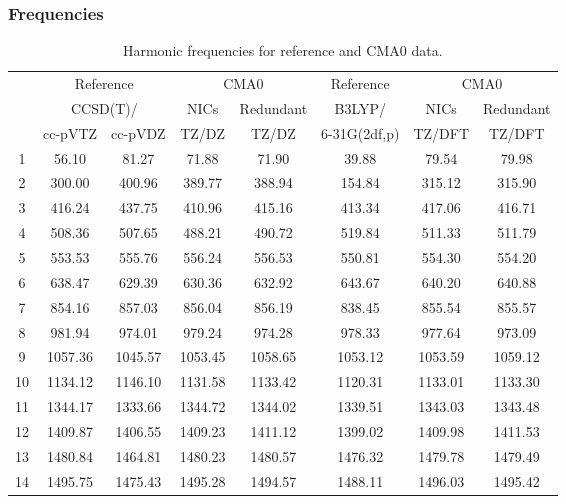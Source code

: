\documentclass[10pt,oneside]{article}
\begin{document}
\begin{table}[h!]
\subsubsection*{Frequencies}
\centering
\caption{Harmonic frequencies for reference and CMA0 data.}
\begin{tabular}{cccccccc}
\toprule
{} & \multicolumn{2}{c}{Reference} & \multicolumn{2}{c}{CMA0} &    Reference & \multicolumn{2}{c}{CMA0} \\
{} & \multicolumn{2}{c}{CCSD(T)/} &    NICs &  Redundant &       B3LYP/ &    NICs & Redundant \\
{} &   cc-pVTZ & cc-pVDZ &   TZ/DZ &      TZ/DZ & 6-31G(2df,p) &  TZ/DFT &    TZ/DFT \\
\midrule
1  &     56.10 &   81.27 &   71.88 &      71.90 &        39.88 &   79.54 &     79.98 \\
2  &    300.00 &  400.96 &  389.77 &     388.94 &       154.84 &  315.12 &    315.90 \\
3  &    416.24 &  437.75 &  410.96 &     415.16 &       413.34 &  417.06 &    416.71 \\
4  &    508.36 &  507.65 &  488.21 &     490.72 &       519.84 &  511.33 &    511.79 \\
5  &    553.53 &  555.76 &  556.24 &     556.53 &       550.81 &  554.30 &    554.20 \\
6  &    638.47 &  629.39 &  630.36 &     632.92 &       643.67 &  640.20 &    640.88 \\
7  &    854.16 &  857.03 &  856.04 &     856.19 &       838.45 &  855.54 &    855.57 \\
8  &    981.94 &  974.01 &  979.24 &     974.28 &       978.33 &  977.64 &    973.09 \\
9  &   1057.36 & 1045.57 & 1053.45 &    1058.65 &      1053.12 & 1053.59 &   1059.12 \\
10 &   1134.12 & 1146.10 & 1131.58 &    1133.42 &      1120.31 & 1133.01 &   1133.30 \\
11 &   1344.17 & 1333.66 & 1344.72 &    1344.02 &      1339.51 & 1343.03 &   1343.48 \\
12 &   1409.87 & 1406.55 & 1409.23 &    1411.12 &      1399.02 & 1409.98 &   1411.53 \\
13 &   1480.84 & 1464.81 & 1480.23 &    1480.57 &      1476.32 & 1479.78 &   1479.49 \\
14 &   1495.75 & 1475.43 & 1495.28 &    1494.57 &      1488.11 & 1496.03 &   1495.42 \\

\end{tabular}
\end{table}
\end{document}
